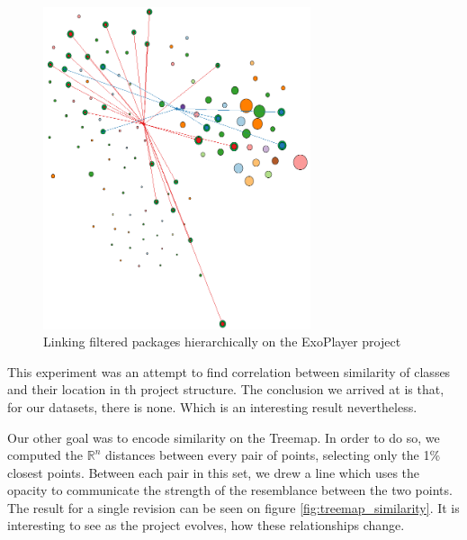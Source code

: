 \begin{figure}[H]
	\centering
	\includegraphics[width=0.7\textwidth]{figures/hier_two_sim_graph.png}
	\caption{Linking filtered packages hierarchically on the ExoPlayer project}
	\label{fig:hier_two_sim_graph}
\end{figure}

This experiment was an attempt to find correlation between similarity of classes and their location in th project structure. The conclusion we arrived at is that, for our datasets, there is none. Which is an interesting result nevertheless.

Our other goal was to encode similarity on the Treemap. In order to do so, we computed the $\mathbb{R}^{n}$ distances between every pair of points, selecting only the 1\% closest points. Between each pair in this set, we drew a line which uses the opacity to communicate the strength of the resemblance between the two points. The result for a single revision can be seen on figure \ref{fig:treemap_similarity}. It is interesting to see as the project evolves, how these relationships change.

